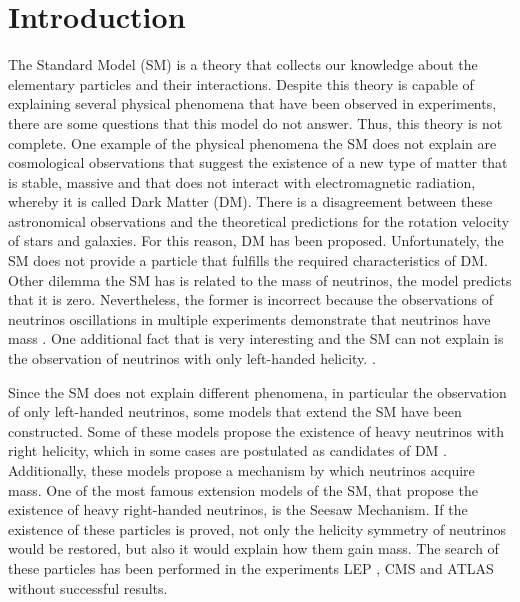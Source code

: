 \chapter{Introduction}
\label{Introduction_chapter}

The Standard Model (SM) is a theory that collects our knowledge about the elementary particles and their interactions. Despite this theory is capable of explaining several physical phenomena that have been observed in experiments, there are some questions that this model do not answer. Thus, this theory is not complete. One example of the physical phenomena the SM does not explain are cosmological observations that suggest the existence of a new type of matter that is stable, massive and that does not interact with electromagnetic radiation, whereby it is called Dark Matter (DM). There is a disagreement between these astronomical observations and the theoretical predictions for the rotation velocity of stars and galaxies. For this reason, DM has been proposed. Unfortunately, the SM does not provide a particle that fulfills the required characteristics of DM. Other dilemma the SM has is related to the mass of neutrinos, the model predicts that it is zero. Nevertheless, the former is incorrect because the observations of neutrinos oscillations in multiple experiments demonstrate that neutrinos have mass \cite{Neutrino experiment 1 mass, Neutrino experiment 2 mass}. One additional fact that is very interesting and the SM can not explain is the observation of neutrinos with only left-handed helicity. . 

Since the SM does not explain different phenomena, in particular the observation of only left-handed neutrinos, some models that extend the SM have been constructed. Some of these models propose the existence of heavy neutrinos with right helicity, which in some cases are postulated as candidates of DM \cite{Neutrino dark matter candidate 1, Neutrino dark matter candidate 2}. Additionally, these models propose a mechanism by which neutrinos acquire mass. One of the most famous extension models of the SM, that propose the existence of heavy right-handed neutrinos, is the Seesaw Mechanism. If the existence of these particles is proved, not only the helicity symmetry of neutrinos would be restored, but also it would explain how them gain mass. The search of these particles has been performed in the experiments LEP \cite{Lep experiment}, CMS \cite{CMS experiment} and ATLAS \cite{ATLAS experiment} without successful results.


